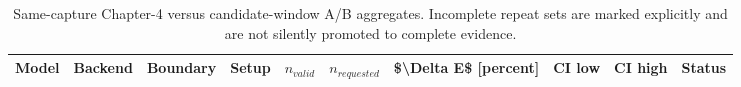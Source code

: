 \begin{table}[t]
\centering
\small
\caption{Same-capture Chapter-4 versus candidate-window A/B aggregates. Incomplete repeat sets are marked explicitly and are not silently promoted to complete evidence.}
\label{tab:native-energy-ab-aggregates}
\begin{tabular}{lrrrrrrrrr}
\toprule
Model & Backend & Boundary & Setup & $n_{valid}$ & $n_{requested}$ & \$\textbackslash{}Delta E\$ [percent] & CI low & CI high & Status \\
\midrule
\bottomrule
\end{tabular}
\end{table}

